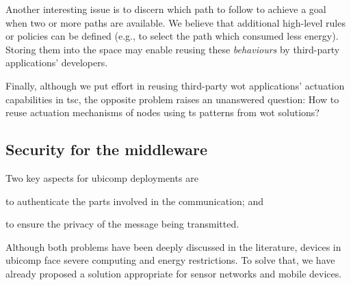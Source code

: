 % 

Another interesting issue is to discern which path to follow to achieve a goal when two or more paths are available.
We believe that additional high-level rules or policies can be defined (e.g., to select the path which consumed less energy).
Storing them into the space may enable reusing these \emph{behaviours} by third-party applications' developers.

Finally, although we put effort in reusing third-party \ac{wot} applications' actuation capabilities in \ac{tsc}, the opposite problem raises an unanswered question:
How to reuse actuation mechanisms of nodes using \ac{ts} patterns from \ac{wot} solutions?


\subsection{Security for the middleware}

Two key aspects for \ac{ubicomp} deployments are
\begin{enumerate*}[label=\itshape(\arabic*\upshape)]
  \item to authenticate the parts involved in the communication; and
  \item to ensure the privacy of the message being transmitted.
\end{enumerate*}
Although both problems have been deeply discussed in the literature,
devices in \ac{ubicomp} face severe computing and energy restrictions.
To solve that, we have already proposed a solution appropriate for sensor networks and mobile devices.

